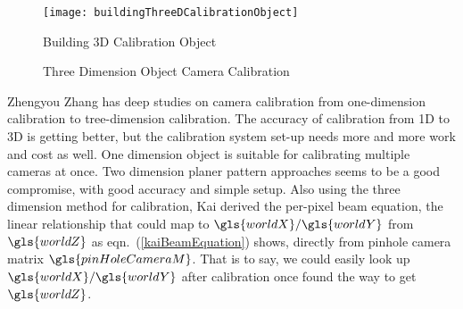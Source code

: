 %
\begin{figure}[!t]
\centering
\texttt{[image: buildingThreeDCalibrationObject]}
\caption{Building \gls{3D} Calibration Object \cite{threeDExample_2014}}
\label{buildingThreeDCalibrationObject}
\end{figure}%
%
\begin{figure}[!t]
\centering
{}
\caption{Three Dimension Object Camera Calibration \cite{threeDExample_2014}}
\label{twoPlanesCalibration}
\end{figure}%
%


%





Zhengyou Zhang \cite{zhangCalibration1_2004, zhangCalibration2_2000, Zhengyou04} has deep studies on camera calibration from one-dimension calibration to tree-dimension calibration. The accuracy of calibration from 1D to \gls{3D} is getting better, but the calibration system set-up needs more and more work and cost as well. One dimension object is suitable for calibrating multiple cameras at once. Two dimension planer pattern approaches seems to be a good compromise, with good accuracy and simple setup. Also using the three dimension method for calibration, Kai \cite{Kai10} derived the per-pixel  beam equation, the linear relationship that could map to \(\gls{worldX}/\gls{worldY}\) from \(\gls{worldZ}\) as eqn.~(\ref{kaiBeamEquation}) shows, directly from pinhole camera matrix \(\gls{pinHoleCameraM}\). That is to say, we could easily look up \(\gls{worldX}/\gls{worldY}\) after calibration once found the way to get \(\gls{worldZ}\).

